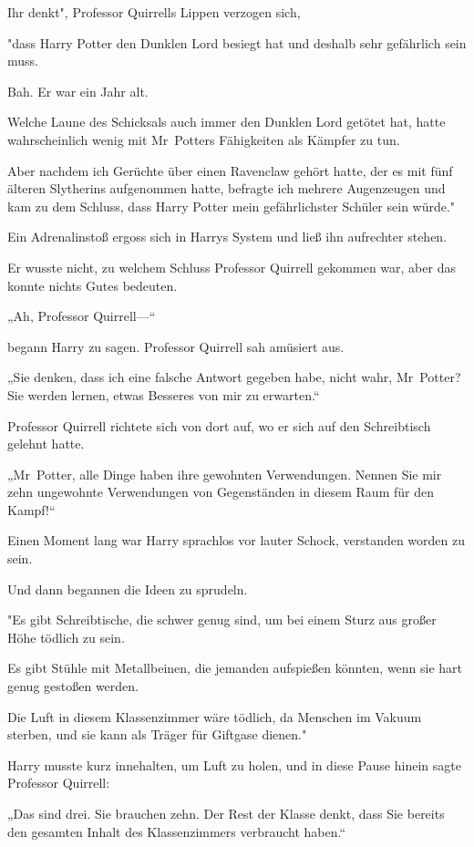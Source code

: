 {Ihr denkt", Professor Quirrells Lippen verzogen sich,

"dass Harry Potter den Dunklen Lord besiegt hat und deshalb sehr gefährlich sein muss.

Bah. Er war ein Jahr alt.

Welche Laune des Schicksals auch immer den Dunklen Lord getötet hat, hatte wahrscheinlich wenig mit Mr~Potters Fähigkeiten als Kämpfer zu tun.

Aber nachdem ich Gerüchte über einen Ravenclaw gehört hatte, der es mit fünf älteren Slytherins aufgenommen hatte, befragte ich mehrere Augenzeugen und kam zu dem Schluss, dass Harry Potter mein gefährlichster Schüler sein würde."

Ein Adrenalinstoß ergoss sich in Harrys System und ließ ihn aufrechter stehen.

Er wusste nicht, zu welchem Schluss Professor Quirrell gekommen war, aber das konnte nichts Gutes bedeuten.

„Ah, Professor Quirrell—“

begann Harry zu sagen. Professor Quirrell sah amüsiert aus.

„Sie denken, dass ich eine falsche Antwort gegeben habe, nicht wahr, Mr~Potter? Sie werden lernen, etwas Besseres von mir zu erwarten.“

Professor Quirrell richtete sich von dort auf, wo er sich auf den Schreibtisch gelehnt hatte.

„Mr~Potter, alle Dinge haben ihre gewohnten Verwendungen. Nennen Sie mir zehn ungewohnte Verwendungen von Gegenständen in diesem Raum für den Kampf!“

Einen Moment lang war Harry sprachlos vor lauter Schock, verstanden worden zu sein.

Und dann begannen die Ideen zu sprudeln.

"Es gibt Schreibtische, die schwer genug sind, um bei einem Sturz aus großer Höhe tödlich zu sein.

Es gibt Stühle mit Metallbeinen, die jemanden aufspießen könnten, wenn sie hart genug gestoßen werden.

Die Luft in diesem Klassenzimmer wäre tödlich, da Menschen im Vakuum sterben, und sie kann als Träger für Giftgase dienen."

Harry musste kurz innehalten, um Luft zu holen, und in diese Pause hinein sagte Professor Quirrell:

„Das sind drei. Sie brauchen zehn. Der Rest der Klasse denkt, dass Sie bereits den gesamten Inhalt des Klassenzimmers verbraucht haben.“

}
